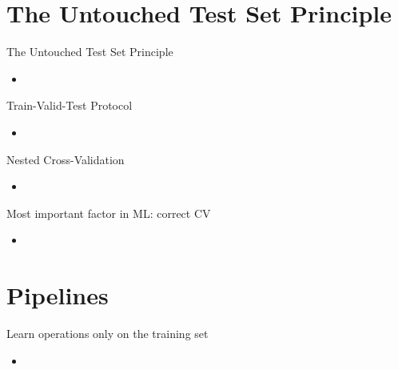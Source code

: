 \documentclass[11pt,compress,t,notes=noshow, aspectratio=169, xcolor=table]{beamer}
\begin{document}
\section{The Untouched Test Set Principle}
\begin{frame}{The Untouched Test Set Principle}

\begin{itemize}
\setlength\itemsep{2em}
    \item 
\end{itemize}
\end{frame}

\begin{frame}{Train-Valid-Test Protocol}

\begin{itemize}
\setlength\itemsep{2em}
    \item 
\end{itemize}
\end{frame}

\begin{frame}{Nested Cross-Validation}

\begin{itemize}
\setlength\itemsep{2em}
    \item 
\end{itemize}
\end{frame}

\begin{frame}{Most important factor in ML: correct CV}

\begin{itemize}
\setlength\itemsep{2em}
    \item 
\end{itemize}
\end{frame}

\section{Pipelines}
\begin{frame}{Learn operations only on the training set}

\begin{itemize}
\setlength\itemsep{2em}
    \item 
\end{itemize}
\end{frame}

\endlecture
\end{document}
